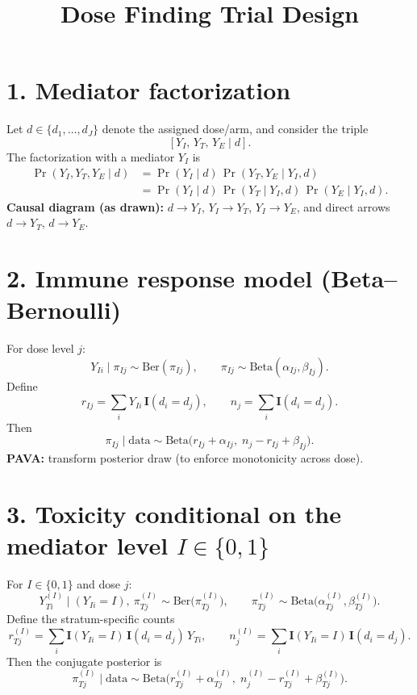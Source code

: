 \documentclass[11pt]{article}
\title{Dose Finding Trial Design}
\author{}
\date{}
\newcommand{\Ind}{\mathbf{I}} %
\newcommand{\Ber}{\mathrm{Ber}}
\newcommand{\BetaDist}{\mathrm{Beta}}
\newcommand{\Prb}{\Pr}
\begin{document}
\maketitle

\section*{1. Mediator factorization}

Let $d\in\{d_1,\ldots,d_J\}$ denote the assigned dose/arm, and consider the triple
\[ [Y_I,\,Y_T,\,Y_E\mid d]. \]
The factorization with a mediator $Y_I$ is
\begin{align*}
\Prb(Y_I,Y_T,Y_E\mid d)
&=\Prb(Y_I\mid d)\,\Prb(Y_T,Y_E\mid Y_I,d)\\
&=\Prb(Y_I\mid d)\,\Prb(Y_T\mid Y_I,d)\,\Prb(Y_E\mid Y_I,d).
\end{align*}
\noindent\textbf{Causal diagram (as drawn):} $d\to Y_I$, $Y_I\to Y_T$, $Y_I\to Y_E$, and direct arrows $d\to Y_T$, $d\to Y_E$.

\section*{2. Immune response model (Beta--Bernoulli)}

For dose level $j$:
\[
Y_{Ii}\mid \pi_{Ij}\sim \Ber(\pi_{Ij}),\qquad
\pi_{Ij}\sim \BetaDist(\alpha_{Ij},\beta_{Ij}).
\]
Define
\[
r_{Ij}=\sum_i Y_{Ii}\,\Ind(d_i=d_j),\qquad
n_j=\sum_i \Ind(d_i=d_j).
\]
Then
\[
\pi_{Ij}\mid \text{data}\sim \BetaDist\big(r_{Ij}+\alpha_{Ij},\;n_j-r_{Ij}+\beta_{Ij}\big).
\]
\noindent\textbf{PAVA:} transform posterior draw (to enforce monotonicity across dose).

\section*{3. Toxicity conditional on the mediator level $I\in\{0,1\}$}

For $I\in\{0,1\}$ and dose $j$:
\[
Y_{Ti}^{(I)}\mid (Y_{Ii}=I),\ \pi_{Tj}^{(I)}\sim \Ber\big(\pi_{Tj}^{(I)}\big),
\qquad
\pi_{Tj}^{(I)}\sim \BetaDist\big(\alpha_{Tj}^{(I)},\beta_{Tj}^{(I)}\big).
\]
Define the stratum-specific counts
\[
r_{Tj}^{(I)}=\sum_i \Ind(Y_{Ii}=I)\,\Ind(d_i=d_j)\,Y_{Ti},
\qquad
n_j^{(I)}=\sum_i \Ind(Y_{Ii}=I)\,\Ind(d_i=d_j).
\]
Then the conjugate posterior is
\[
\pi_{Tj}^{(I)}\mid \text{data}\sim
\BetaDist\Big(r_{Tj}^{(I)}+\alpha_{Tj}^{(I)},\;n_j^{(I)}-r_{Tj}^{(I)}+\beta_{Tj}^{(I)}\Big).
\]
\end{document}
